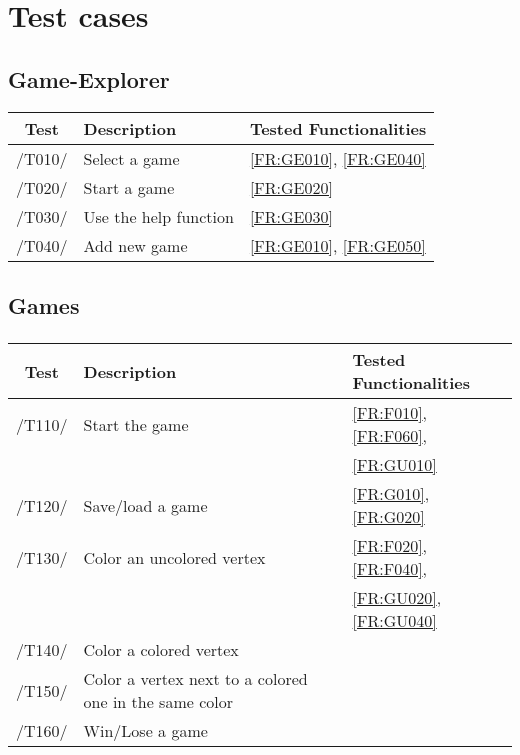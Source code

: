 \section{Test cases}

\subsection{Game-Explorer}

\begin{tabular}{cll}

\hline
\textbf{Test} & \textbf{Description} & \textbf{Tested Functionalities} \\
\hline
/T010/ & Select a game & \ref{FR:GE010}, \ref{FR:GE040} \\
/T020/ & Start a game & \ref{FR:GE020} \\
/T030/ & Use the help function & \ref{FR:GE030} \\
/T040/ & Add new game & \ref{FR:GE010}, \ref{FR:GE050} \\
\hline

\end{tabular}

\subsection{Games}

\subsubsection{\graphcoloring}

\begin{tabular}{cll}

\hline
\textbf{Test} & \textbf{Description} & \textbf{Tested Functionalities} \\
\hline
/T110/ & Start the game & \ref{FR:F010}, \ref{FR:F060},\\
 & & \ref{FR:GU010} \\
/T120/ & Save/load a game & \ref{FR:G010}, \ref{FR:G020}\\
/T130/ & Color an uncolored vertex & \ref{FR:F020}, \ref{FR:F040}, \\
 & & \ref{FR:GU020}, \ref{FR:GU040}\\
/T140/ & Color a colored vertex & \\
/T150/ & Color a vertex next to a colored one in the same color & \\
/T160/ & Win/Lose a game & \\
\hline

\end{tabular}

